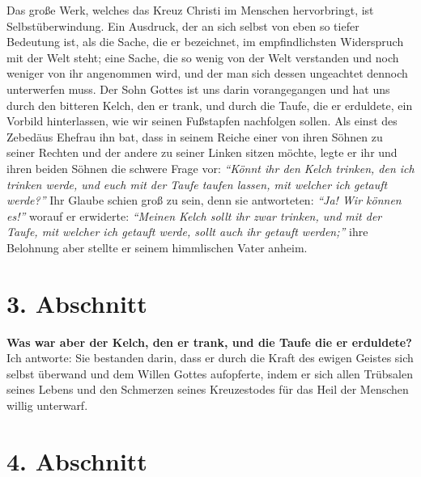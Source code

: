 Das große Werk, welches das Kreuz Christi im Menschen hervorbringt, ist
Selbstüberwindung. Ein Ausdruck, der an sich selbst von eben so tiefer Bedeutung
ist, als die Sache, die er bezeichnet, im empfindlichsten Widerspruch mit der
Welt steht; eine Sache, die so wenig von der Welt verstanden und noch weniger
von ihr angenommen wird, und der man sich dessen ungeachtet dennoch unterwerfen
muss. Der Sohn Gottes ist uns darin vorangegangen und hat uns durch den bitteren
Kelch, den er trank, und durch die Taufe, die er
erduldete, ein
Vorbild
hinterlassen, wie wir seinen Fußstapfen nachfolgen sollen. Als einst des
Zebedäus Ehefrau ihn bat, dass in seinem
Reiche einer von ihren Söhnen zu
seiner Rechten und der andere zu seiner Linken sitzen möchte, legte er ihr und
ihren beiden Söhnen die schwere Frage vor:
\textit{"`Könnt ihr den Kelch trinken, den
ich trinken werde, und euch mit der Taufe taufen lassen, mit welcher ich
getauft werde?"'}
Ihr Glaube schien groß zu sein, denn
sie antworteten:\textit{ "`Ja! Wir können es!"'} worauf er erwiderte:
 \textit{"`Meinen Kelch
sollt ihr zwar trinken, und mit der Taufe, mit welcher ich getauft werde, sollt
auch ihr getauft werden;"'} ihre Belohnung aber stellte er seinem himmlischen
Vater anheim.

\section{3. Abschnitt} \label{kap4_ab3}

\textbf{Was war aber der Kelch, den er trank, und die Taufe die er erduldete?}
Ich
antworte: Sie bestanden darin, dass er durch die Kraft des ewigen Geistes sich
selbst überwand und
dem
Willen Gottes aufopferte, indem er sich allen
Trübsalen seines Lebens und den Schmerzen seines Kreuzestodes für das Heil der
Menschen willig unterwarf.

\section{4. Abschnitt} \label{kap4_ab4}

